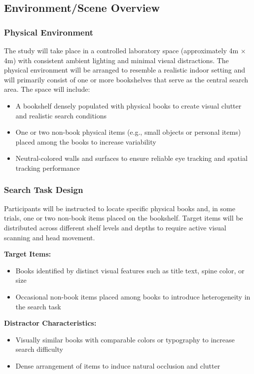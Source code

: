 \documentclass[12pt,letterpaper]{article}
\begin{document}
\subsection{Environment/Scene Overview}

\subsubsection{Physical Environment}
The study will take place in a controlled laboratory space (approximately 4m × 4m) with consistent ambient lighting and minimal visual distractions. The physical environment will be arranged to resemble a realistic indoor setting and will primarily consist of one or more bookshelves that serve as the central search area. The space will include:

\begin{itemize}
    \item A bookshelf densely populated with physical books to create visual clutter and realistic search conditions
    \item One or two non-book physical items (e.g., small objects or personal items) placed among the books to increase variability
    \item Neutral-colored walls and surfaces to ensure reliable eye tracking and spatial tracking performance
\end{itemize}

\subsubsection{Search Task Design}
Participants will be instructed to locate specific physical books and, in some trials, one or two non-book items placed on the bookshelf. Target items will be distributed across different shelf levels and depths to require active visual scanning and head movement.

\textbf{Target Items:}
\begin{itemize}
    \item Books identified by distinct visual features such as title text, spine color, or size
    \item Occasional non-book items placed among books to introduce heterogeneity in the search task
\end{itemize}

\textbf{Distractor Characteristics:}
\begin{itemize}
    \item Visually similar books with comparable colors or typography to increase search difficulty
    \item Dense arrangement of items to induce natural occlusion and clutter
\end{itemize}
\end{document}
